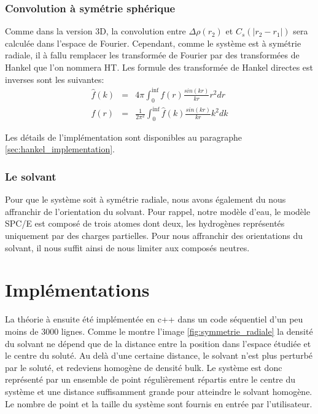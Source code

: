 \subsubsection{Convolution à symétrie sphérique}
Comme dans la version 3D, la convolution entre $\Delta\rho(r_2)$ et $C_s(|r_2-r_1|)$ sera calculée dans l'espace de Fourier. Cependant, comme le système est à symétrie radiale, il à fallu remplacer les transformée de Fourier par des transformées de Hankel que l'on nommera HT. Les formule des transformée de Hankel directes est inverses sont les suivantes:
\begin{eqnarray}
\widehat{f}(k)&=&4\pi\int_{0}^{\inf}f(r)\frac{sin(kr)}{kr}r^2dr\\
f(r)&=&\frac{1}{2\pi^2}\int_{0}^{\inf}\widehat{f}(k)\frac{sin(kr)}{kr}k^2dk
\end{eqnarray}



Les détails de l'implémentation sont disponibles au paragraphe \ref{sec:hankel_implementation}. 

\subsubsection{Le solvant}
Pour que le système soit à symétrie radiale, nous avons également du nous affranchir de l'orientation du solvant. Pour rappel, notre modèle d'eau, le modèle SPC/E est composé de trois atomes dont deux, les hydrogènes représentés uniquement par des charges partielles. Pour nous affranchir des orientations du solvant, il nous suffit ainsi de nous limiter aux composés neutres.

\section{Implémentations}
La théorie à ensuite été implémentée en c++ dans un code séquentiel d'un peu moins de 3000 lignes. Comme le montre l'image \ref{fig:symmetrie_radiale} la densité du solvant ne dépend que de la distance entre la position dans l'espace étudiée et le centre du soluté. Au delà d'une certaine distance, le solvant n'est plus perturbé par le soluté, et redeviens homogène de densité bulk. Le système est donc représenté par un ensemble de point régulièrement répartis entre le centre du système et une distance suffisamment grande pour atteindre le solvant homogène. Le nombre de point et la taille du système sont fournis en entrée par l'utilisateur.


